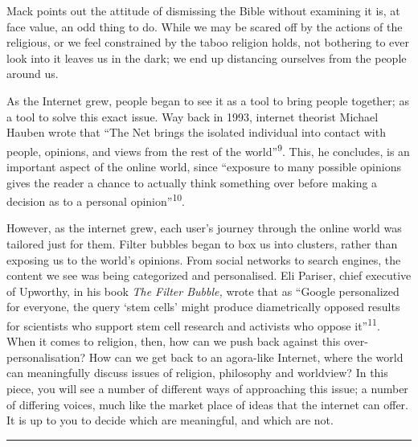 \documentclass[]{article}
\begin{document}
Mack points out the attitude of dismissing the Bible without examining
it is, at face value, an odd thing to do. While we may be scared off by
the actions of the religious, or we feel constrained by the taboo
religion holds, not bothering to ever look into it leaves us in the
dark; we end up distancing ourselves from the people around us.

As the Internet grew, people began to see it as a tool to bring people
together; as a tool to solve this exact issue. Way back in 1993,
internet theorist Michael Hauben wrote that ``The Net brings the
isolated individual into contact with people, opinions, and views from
the rest of the world''\textsuperscript{9}. This, he concludes, is an
important aspect of the online world, since ``exposure to many possible
opinions gives the reader a chance to actually think something over
before making a decision as to a personal opinion''\textsuperscript{10}.

However, as the internet grew, each user's journey through the online
world was tailored just for them. Filter bubbles began to box us into
clusters, rather than exposing us to the world's opinions. From social
networks to search engines, the content we see was being categorized and
personalised. Eli Pariser, chief executive of Upworthy, in his book
\emph{The Filter Bubble, }wrote that as ``Google personalized for
everyone, the query `stem cells' might produce diametrically opposed
results for scientists who support stem cell research and activists who
oppose it''\textsuperscript{11}. When it comes to religion, then, how
can we push back against this over-personalisation? How can we get back
to an agora-like Internet, where the world can meaningfully discuss
issues of religion, philosophy and worldview? In this piece, you will
see a number of different ways of approaching this issue; a number of
differing voices, much like the market place of ideas that the internet
can offer. It is up to you to decide which are meaningful, and which are
not.

\begin{center}\rule{0.5\linewidth}{\linethickness}\end{center}
\end{document}

